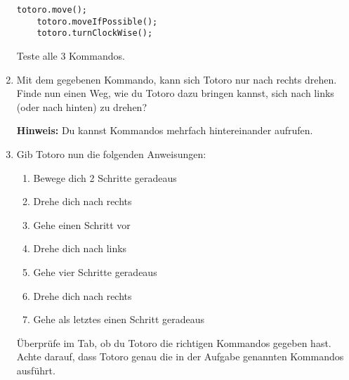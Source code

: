 \begin{enumerate}
        \begin{lstlisting}[firstnumber=20]
    totoro.move();
    totoro.moveIfPossible();
    totoro.turnClockWise();
        \end{lstlisting}

        Teste alle 3 Kommandos.\\
        \item Mit dem gegebenen Kommando, kann sich Totoro nur nach rechts drehen.\\
        Finde nun einen Weg, wie du Totoro dazu bringen kannst, sich nach links (oder nach hinten) zu drehen?
        
        \textbf{Hinweis:} Du kannst Kommandos mehrfach hintereinander aufrufen.
\newpage
        \item Gib Totoro nun die folgenden Anweisungen:
        
        {
\begin{enumerate}
\item Bewege dich 2 Schritte geradeaus
\item Drehe dich nach rechts
\item Gehe einen Schritt vor
\item Drehe dich nach links
\item Gehe vier Schritte geradeaus
\item Drehe dich nach rechts
\item Gehe als letztes einen Schritt geradeaus
\end{enumerate}
}

Überprüfe im  Tab, ob du Totoro die richtigen Kommandos gegeben hast. 
Achte darauf, dass Totoro genau die in der Aufgabe genannten Kommandos ausführt.
\end{enumerate}

